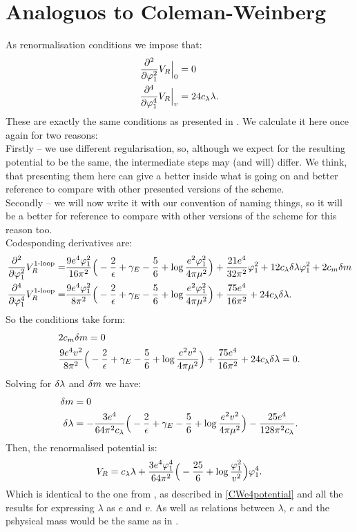 \section{Analoguos to Coleman-Weinberg}
As renormalisation conditions we impose that:
\begin{align}
\frac{\partial^2 }{\partial \varphi_1^2}V_R\Big|_{0} &= 0 \\
\frac{\partial^4 }{\partial \varphi_1^4}V_R\Big|_{v} &= 24c_\lambda\lambda.
\end{align}
These are exactly the same conditions as presented in \citeColWein. We calculate it here once 
again for two reasons: \\ 

Firstly -- we use different regularisation, so, although we expect 
for the resulting potential to be the same, the intermediate steps may (and will) differ. 
We think, that 
presenting them here can give a better inside what is going on and better reference to compare 
with other presented versions of the scheme. \\

Secondly -- we will now write it with our convention of naming things, so it will be a better 
for reference
to compare with other versions of the scheme for this reason too. \\

Codesponding derivatives are:
\begin{align}
\frac{\partial^2 }{\partial \varphi_1^2}V_R^{\textrm{1-loop}} = &\frac{9e^4\varphi_1^2}{16\pi^2}\Big(-\frac{2}{\epsilon}+\gamma_E-
\frac{5}{6}+\log{\frac{e^2\varphi_1^2}{4\pi\mu^2}}\Big)+\frac{21e^4}{32\pi^2}\varphi_1^2+ 
12c_\lambda\delta\lambda\varphi_1^2+2c_m\delta m \\
\frac{\partial^4 }{\partial \varphi_1^4}V_R^{\textrm{1-loop}} = &\frac{9e^4\varphi_1^2}{8\pi^2}\Big(-\frac{2}{\epsilon}+\gamma_E-
\frac{5}{6}+\log{\frac{e^2\varphi_1^2}{4\pi\mu^2}}\Big)+\frac{75e^4}{16\pi^2}+24c_\lambda\delta\lambda.
\end{align}
So the conditions take form:
\begin{align}
&2c_m\delta m = 0\\
&\frac{9e^4v^2}{8\pi^2}\Big(-\frac{2}{\epsilon}+\gamma_E-
\frac{5}{6}+\log{\frac{e^2v^2}{4\pi\mu^2}}\Big)+\frac{75e^4}{16\pi^2}+24c_\lambda\delta\lambda = 0.
\end{align}
Solving for $\delta\lambda$ and $\delta m$ we have:
\begin{align}
\delta m &= 0 \\
\delta\lambda &= -\frac{3e^4}{64\pi^2c_\lambda}\Big(-\frac{2}{\epsilon}+\gamma_E-
\frac{5}{6}+\log\frac{e^2v^2}{4\pi\mu^2}\Big)-\frac{25e^4}{128\pi^2c_\lambda} .
\end{align}
Then, the renormalised potential is:
\begin{align}
V_R = c_\lambda\lambda + \frac{3e^4\varphi_1^4}{64\pi^2}\Big(- 
\frac{25}{6}+\log\frac{\varphi_1^2}{v^2}\Big)\varphi_1^4.
\end{align}
Which is identical to the one from \citeColWein, as described in \ref{CWe4potential} and all the 
results for expressing $\lambda$ as $e$ and $v$. As well as relations between $\lambda$, $e$ and 
the pshysical mass would be the same as in \citeColWein. \\

